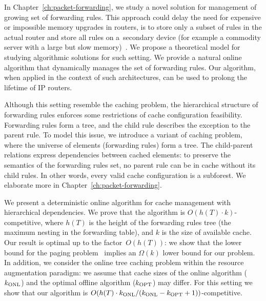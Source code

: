 In Chapter~\ref{ch:packet-forwarding}, we study a novel solution for management of growing set of forwarding rules.
This approach could delay
the need for expensive or impossible memory upgrades in routers, is to store
only a subset of rules in the actual router and store all rules on a~secondary
device (for example a commodity server with a large but slow
memory)~\cite{cacheflow,route-caching-flat,prefix-caching,fib-caching-non-overlapping,fibium-zipf}.
We propose a theoretical model for studying algorithmic solutions for such setting.
We provide a natural online algorithm that dynamically manages the set of forwarding rules.
Our 
algorithm, when applied in the context of such architectures, can 
be used to prolong the lifetime of IP routers.


Although this setting resemble the caching problem, the hierarchical structure of forwarding rules enforces some restrictions of cache configuration feasibility.
Forwarding rules form a tree, and the child rule describes the exception to the parent rule.
To model this issue, we introduce a variant of caching problem, where the universe of elements (forwarding rules) form a tree.
The child-parent relations express dependencies between cached elements: to preserve the semantics of the forwarding rules set, no parent rule can be in cache without its child rules.
In other words, every valid cache configuration is a subforest.
We elaborate more in Chapter~\ref{ch:packet-forwarding}.


We present a deterministic online algorithm for cache management with hierarchical dependencies.
We prove that the algorithm is
$O(h(T)\cdot k)$-competitive, where $h(T)$ is the height of the forwarding rules tree (the maximum nesting in the forwarding table), and $k$ is the size of available cache.
Our result is optimal up to the factor~$O(h(T))$: we show that the lower
bound for the paging problem~\cite{competitive-analysis} implies an
$\Omega(k)$ lower bound for our problem.
In addition, we consider the online tree caching problem within the resource
augmentation paradigm: we assume that cache sizes of the online algorithm
($k_\textnormal{ONL}$)  and the optimal offline algorithm ($k_\textnormal{OPT}$) may differ.
For this setting we show that our algorithm is
$O(h(T) \cdot k_\textnormal{ONL}/(k_\textnormal{ONL}-k_\textnormal{OPT}+1))$-competitive.


